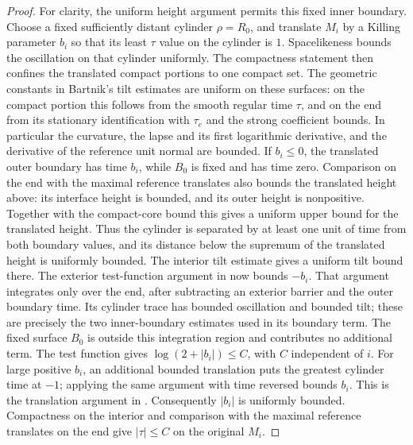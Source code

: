 \begin{proof}
For clarity, the uniform height argument permits this fixed inner
boundary.  Choose a fixed sufficiently distant cylinder
$\rho=R_0$, and translate $M_i$ by a Killing parameter $b_i$ so
that its least $\tau$ value on the cylinder is $1$.
Spacelikeness bounds the oscillation on that cylinder uniformly.
The compactness statement
\cite[Corollary~3.6]{ChruscielWald1994} then confines the translated
compact portions to one compact set.  The geometric constants in
Bartnik's tilt estimates are uniform on these surfaces: on the
compact portion this follows from the smooth regular time $\tau$,
and on the end from its stationary identification with $\tau_e$
and the strong coefficient bounds.  In particular the curvature,
the lapse and its first logarithmic derivative, and the derivative
of the reference unit normal are bounded.  If $b_i\leq0$, the translated
outer boundary has time $b_i$, while $B_0$ is fixed and has time
zero.  Comparison on the end with the maximal reference translates
also bounds the translated height above: its interface height is
bounded, and its outer height is nonpositive.  Together with the
compact-core bound this gives a uniform upper bound for the
translated height.  Thus the cylinder is separated by at least one
unit of time from both boundary values, and its distance below
the supremum of the translated height is uniformly bounded.
The interior tilt estimate
\cite[Theorem~3.1(iv), Equation~(3.14)]{Bartnik1984}
gives a uniform tilt bound there.  The exterior test-function
argument in \cite[proof of Theorem~5.3, Equations~(5.13)--(5.18)]{Bartnik1984}
now bounds $-b_i$.  That argument integrates only over the end,
after subtracting an exterior barrier and the outer boundary time.
Its cylinder trace has bounded oscillation and bounded tilt; these
are precisely the two inner-boundary estimates used in its boundary
term.  The fixed surface $B_0$ is outside this integration region
and contributes no additional term.  The test function gives
$\log(2+|b_i|)\leq C$, with $C$ independent of $i$.
For large positive $b_i$, an additional bounded translation puts
the greatest cylinder time at $-1$; applying the same argument with
time reversed bounds $b_i$.  This is the translation argument in
\cite[proof of Theorem~4.2, Equations~(4.22)--(4.26)]{ChruscielWald1994}.
Consequently $|b_i|$ is uniformly bounded.  Compactness on the
interior and comparison with the maximal reference translates on
the end give $|\tau|\leq C$ on the original $M_i$.


\end{proof}
